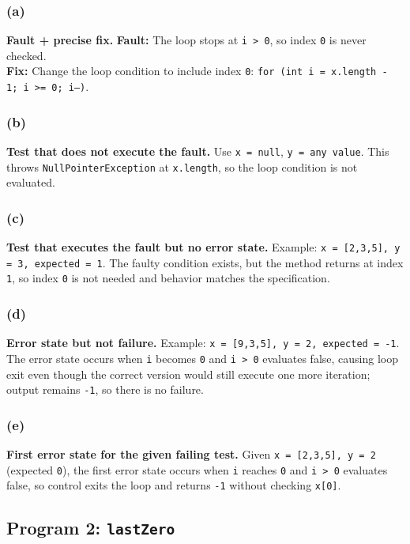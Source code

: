 \subsubsection{(a)}
\textbf{Fault + precise fix.}
\textbf{Fault:} The loop stops at \texttt{i > 0}, so index \texttt{0} is never checked. \\
\textbf{Fix:} Change the loop condition to include index \texttt{0}: \texttt{for (int i = x.length - 1; i >= 0; i--)}.

\subsubsection{(b)}
\textbf{Test that does not execute the fault.}
Use \texttt{x = null}, \texttt{y = any value}. This throws \texttt{NullPointerException} at \texttt{x.length}, so the loop condition is not evaluated.

\subsubsection{(c)}
\textbf{Test that executes the fault but no error state.}
Example: \texttt{x = [2,3,5], y = 3, expected = 1}. The faulty condition exists, but the method returns at index \texttt{1}, so index \texttt{0} is not needed and behavior matches the specification.

\subsubsection{(d)}
\textbf{Error state but not failure.}
Example: \texttt{x = [9,3,5], y = 2, expected = -1}. The error state occurs when \texttt{i} becomes \texttt{0} and \texttt{i > 0} evaluates false, causing loop exit even though the correct version would still execute one more iteration; output remains \texttt{-1}, so there is no failure.

\subsubsection{(e)}
\textbf{First error state for the given failing test.}
Given \texttt{x = [2,3,5], y = 2} (expected \texttt{0}), the first error state occurs when \texttt{i} reaches \texttt{0} and \texttt{i > 0} evaluates false, so control exits the loop and returns \texttt{-1} without checking \texttt{x[0]}.

\subsection{Program 2: \texttt{lastZero}}
